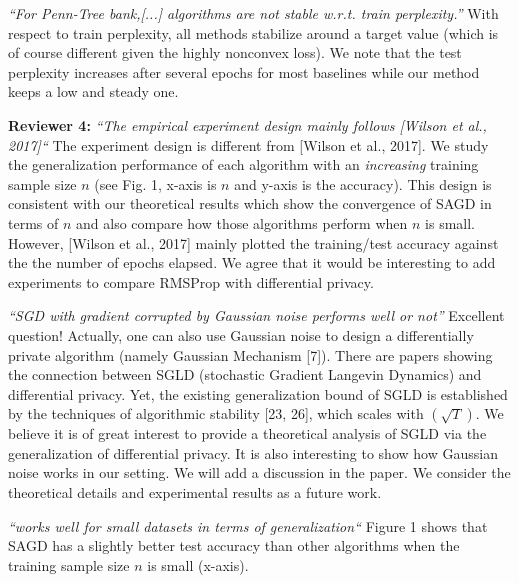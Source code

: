 \documentclass{article}
\begin{document}
\textit{ ``For Penn-Tree bank,[...] algorithms are not stable w.r.t. train perplexity.''}
With respect to train perplexity, all methods stabilize around a target value (which is of course different given the highly nonconvex loss). 
We note that the test perplexity increases after several epochs for most baselines while our method keeps a low and steady one.\vspace{-5pt}

\textbf{Reviewer 4:}
\textit{``The empirical experiment design mainly follows [Wilson et al., 2017]``}
The experiment design is different from [Wilson et al., 2017]. 
We study the generalization performance of each algorithm with an \emph{increasing} training sample size $n$ (see Fig. 1, x-axis is $n$ and y-axis is the accuracy).
This design is consistent with our theoretical results which show the convergence of SAGD in terms of $n$ and also compare how those algorithms perform when $n$ is small.
However, [Wilson et al., 2017] mainly plotted the training/test accuracy against the the number of epochs elapsed. 
We agree that it would be interesting to add experiments to compare RMSProp with differential privacy. \vspace{-5pt}
    
\textit{``SGD with gradient corrupted by Gaussian noise performs well or not''}
Excellent question! 
Actually, one can also use Gaussian noise to design a  differentially private algorithm (namely Gaussian Mechanism [7]). 
There are papers showing the connection between SGLD (stochastic Gradient Langevin Dynamics) and differential privacy. 
Yet, the existing generalization bound of SGLD is established by the techniques of algorithmic stability [23, 26], which scales with $(\sqrt{T})$. 
We believe it is of great interest to provide a theoretical analysis of SGLD via the generalization of differential privacy. 
It is also interesting to show how Gaussian noise works in our setting. 
We will add a discussion in the paper. 
We consider the theoretical details and experimental results as a future work.\vspace{-5pt}

    
\textit{``works well for small datasets in terms of generalization``}
Figure 1 shows that SAGD has a slightly better test accuracy than other algorithms when the training sample size $n$ is small (x-axis). 
    
\end{document}
